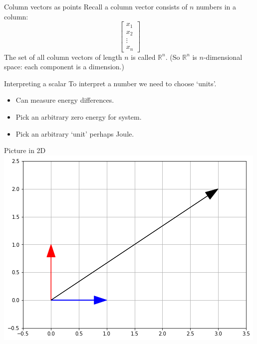 \documentclass{beamer}
\begin{document}
\begin{frame}{Column vectors as points}
  Recall a column vector consists of $n$ numbers in a column:
  \begin{equation*}
    \left[
      \begin{array}{c}
        x_1\\
        x_2\\
        \vdots\\
        x_n
      \end{array}
    \right]
  \end{equation*}
  The set of all column vectors of length $n$ is called $\mathbb R^n$.\vfill
  (So $\mathbb R^n$ is $n$-dimensional space: each component is a dimension.)
\end{frame}

\begin{frame}{Interpreting a scalar}
  To interpret a number we need to choose `units'.
  \begin{example}[Energy]
    \begin{itemize}
    \item Can measure energy differences.
    \item Pick an arbitrary zero energy for system.
    \item Pick an arbitrary `unit' perhaps Joule.
    \end{itemize}
  \end{example}
\end{frame}

\begin{frame}{Picture in 2D}
  \includegraphics[scale=0.6]{2dvector.png}
\end{frame}
\end{document}
